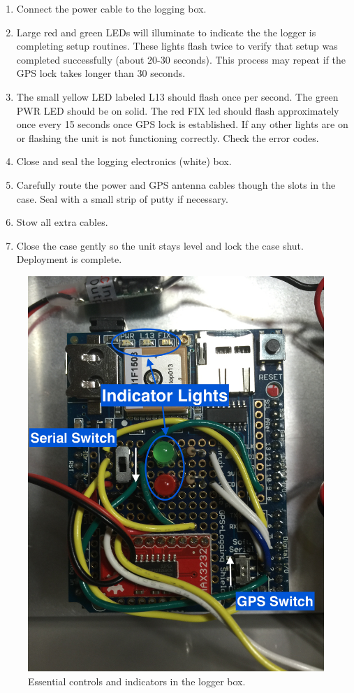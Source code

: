 \documentclass[11pt]{article} %
\begin{document}
\begin{enumerate}
\item Connect the power cable to the logging box. 
\item Large red and green LEDs will illuminate to indicate the the logger is completing setup routines. These lights flash twice to verify that setup was completed successfully (about 20-30 seconds). This process may repeat if the GPS lock takes longer than 30 seconds. 
\item The small yellow LED labeled L13 should flash once per second. The green PWR LED should be on solid. The red FIX led should flash approximately once every 15 seconds once GPS lock is established. If any other lights are on or flashing the unit is not functioning correctly. Check the error codes.
\item Close and seal the logging electronics (white) box.
\item Carefully route the power and GPS antenna cables though the slots in the case. Seal with a small strip of putty if necessary.
\item Stow all extra cables.
\item Close the case gently so the unit stays level and lock the case shut. Deployment is complete.
\end{enumerate}

\begin{figure}
	\centering
		\includegraphics[scale=0.1]{board.jpg}
   	\caption{Essential controls and indicators in the logger box.}
  	\label{labeled_box}
\end{figure}
\end{document}
